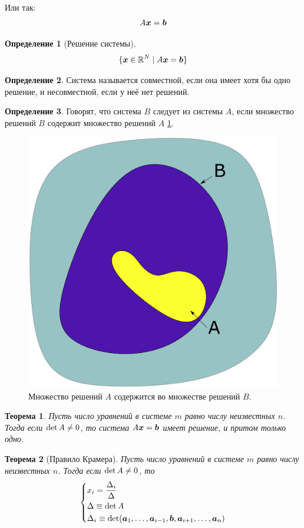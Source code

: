 \documentclass[a4paper,12pt]{article}
\newtheorem{theorem}{Теорема}[section]
\theoremstyle{definition}
\newtheorem{definition}{Определение}[section]
\theoremstyle{remark}
\theoremstyle{remark}
\begin{document}
  Или так:
  \[
    A \boldsymbol x = \boldsymbol b
  \]
  
  \begin{definition}[Решение системы]
    \[
      \{\boldsymbol x \in \operatorname{\mathbb R}^N \mid A \boldsymbol x = \boldsymbol b\}
    \]
  \end{definition}
  
  \begin{definition}
    Система называется совместной, если она имеет хотя бы одно решение, и несовместной, если у неё нет решений.
  \end{definition}
  
  \begin{definition}
    Говорят, что система $B$ следует из системы $A$, если множество решений $B$ содержит множество решений $A$ \ref{fig:a-and-b-sets}.
  \end{definition}
  
  \begin{figure}[h]
    \centering
    
    \includegraphics[width=0.5\columnwidth]{a-and-b-sets}
    
    \caption{Множество решений $A$ содержится во множестве решений $B$.}
    \label{fig:a-and-b-sets}
  \end{figure}
  
  \begin{theorem}
    Пусть число уравнений в системе $m$ равно числу неизвестных $n$.
    Тогда если $\det A \hm{\not=} 0$, то система $A \bds x \hm= \bds b$ имеет решение, и притом только одно.
  \end{theorem}
  
  \begin{theorem}[Правило Крамера]
    Пусть число уравнений в системе $m$ равно числу неизвестных $n$.
    Тогда если $\det A \hm{\not=} 0$, то
    \[
      \left\{
        \begin{aligned}
          &x_i = \frac{\Delta_i}{\Delta}\\
          &\Delta \equiv \det A\\
          &\Delta_i \equiv \det (\boldsymbol a_1, \ldots, \boldsymbol a_{i - 1}, \boldsymbol b, \boldsymbol a_{i + 1}, \ldots, \boldsymbol a_n)
        \end{aligned}
      \right.
    \]
  \end{theorem}
  
\end{document}
